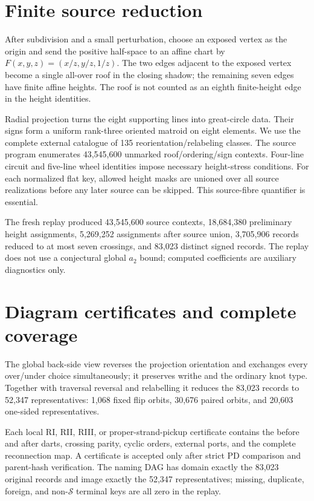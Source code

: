 \documentclass[11pt]{article}
\newcommand{\Sset}{\mathcal S}
\begin{document}
\section{Finite source reduction}
After subdivision and a small perturbation, choose an exposed vertex as the origin and send the positive half-space to an affine chart by $F(x,y,z)=(x/z,y/z,1/z)$. The two edges adjacent to the exposed vertex become a single all-over roof in the closing shadow; the remaining seven edges have finite affine heights. The roof is not counted as an eighth finite-height edge in the height identities.

Radial projection turns the eight supporting lines into great-circle data. Their signs form a uniform rank-three oriented matroid on eight elements. We use the complete external catalogue of 135 reorientation/relabeling classes. The source program enumerates 43,545,600 unmarked roof/ordering/sign contexts. Four-line circuit and five-line wheel identities impose necessary height-stress conditions. For each normalized flat key, allowed height masks are unioned over all source realizations before any later source can be skipped. This source-fibre quantifier is essential.

The fresh replay produced 43,545,600 source contexts, 18,684,380 preliminary height assignments, 5,269,252 assignments after source union, 3,705,906 records reduced to at most seven crossings, and 83,023 distinct signed records. The replay does not use a conjectural global $a_2$ bound; computed coefficients are auxiliary diagnostics only.
\section{Diagram certificates and complete coverage}
The global back-side view reverses the projection orientation and exchanges every over/under choice simultaneously; it preserves writhe and the ordinary knot type. Together with traversal reversal and relabelling it reduces the 83,023 records to 52,347 representatives: 1,068 fixed flip orbits, 30,676 paired orbits, and 20,603 one-sided representatives.

Each local RI, RII, RIII, or proper-strand-pickup certificate contains the before and after darts, crossing parity, cyclic orders, external ports, and the complete reconnection map. A certificate is accepted only after strict PD comparison and parent-hash verification. The naming DAG has domain exactly the 83,023 original records and image exactly the 52,347 representatives; missing, duplicate, foreign, and non-$\Sset$ terminal keys are all zero in the replay.
\end{document}
